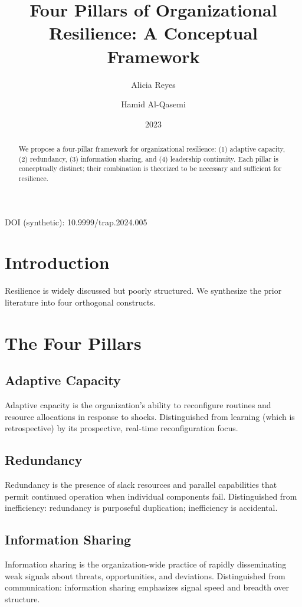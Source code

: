 \documentclass[11pt]{article}
\title{Four Pillars of Organizational Resilience: A Conceptual Framework}
\author{Alicia Reyes \and Hamid Al-Qasemi}
\date{2023}
\begin{document}
\maketitle
\noindent DOI (synthetic): 10.9999/trap.2024.005

\begin{abstract}
We propose a four-pillar framework for organizational resilience: (1) adaptive capacity, (2) redundancy, (3) information sharing, and (4) leadership continuity. Each pillar is conceptually distinct; their combination is theorized to be necessary and sufficient for resilience.
\end{abstract}

\section{Introduction}
Resilience is widely discussed but poorly structured. We synthesize the prior literature into four orthogonal constructs.

\section{The Four Pillars}

\subsection{Adaptive Capacity}
Adaptive capacity is the organization's ability to reconfigure routines and resource allocations in response to shocks. Distinguished from learning (which is retrospective) by its prospective, real-time reconfiguration focus.

\subsection{Redundancy}
Redundancy is the presence of slack resources and parallel capabilities that permit continued operation when individual components fail. Distinguished from inefficiency: redundancy is purposeful duplication; inefficiency is accidental.

\subsection{Information Sharing}
Information sharing is the organization-wide practice of rapidly disseminating weak signals about threats, opportunities, and deviations. Distinguished from communication: information sharing emphasizes signal speed and breadth over structure.
\end{document}
